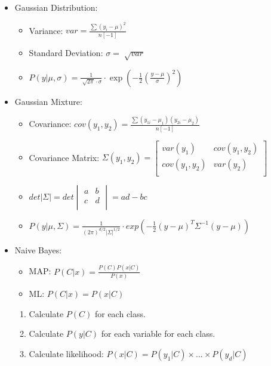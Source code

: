 \documentclass[twocolumn, 10pt]{article}
\begin{document}
\begin{itemize}[leftmargin=*, itemsep=0pt]
    \item Gaussian Distribution:
    \begin{itemize}[topsep=0pt]
        \item Variance: $\displaystyle var=\frac{\sum(y_i-\mu)^2}{n[-1]}$
        \item Standard Deviation: $\displaystyle \sigma=\sqrt[]{var}$
        \item $\displaystyle  P(y|\mu,\sigma)=\frac{1}{\sqrt[]{2\pi}\cdot\sigma}\cdot\exp\left(-\frac{1}{2}\left(\frac{y-\mu}{\sigma}\right)^2\right)$
    \end{itemize}

    \item Gaussian Mixture:
    \begin{itemize}[topsep=0pt]
        \item Covariance: $\displaystyle cov(y_1,y_2)=\frac{\sum(y_{1i}-\mu_1)(y_{2i}-\mu_2)}{n[-1]}$
        \item Covariance Matrix: $\Sigma(y_1,y_2)=
        \begin{bmatrix}
            var(y_1) & cov(y_1,y_2) \\
            cov(y_1,y_2) & var(y_2) \\
        \end{bmatrix}$
        \item $det\left\lvert\Sigma\right\rvert=det
        \begin{vmatrix}
            a & b \\
            c & d \\
        \end{vmatrix}
        = ad-bc$
        \item $\displaystyle P(y|\mu,\Sigma)=\frac{1}{(2\pi)^{d/2}|\Sigma|^{1/2}}\cdot exp\left(-\frac{1}{2}(y-\mu)^T\Sigma^{-1}(y-\mu)\right)$
    \end{itemize}

    \item Naive Bayes: 
    \begin{itemize}[topsep=0pt, itemsep=0pt]
        \item MAP: $\displaystyle P(C|x)=\frac{P(C)P(x|C)}{P(x)}$
        \item ML: $\displaystyle P(C|x)=P(x|C)$
    \end{itemize}
    \begin{enumerate}[topsep=0pt, itemsep=0pt]
        \item Calculate $P(C)$ for each class.
        \item Calculate $P(y|C)$ for each variable for each class.
        \item Calculate likelihood: $P(x|C)=P(y_1|C)\times\ldots\times P(y_d|C)$
    \end{enumerate}
    

\end{itemize}
\end{document}
